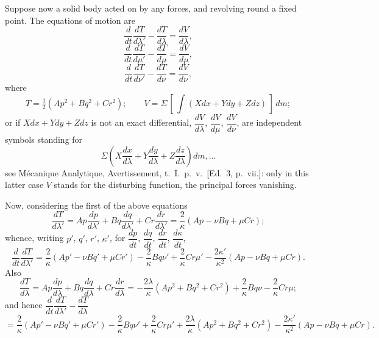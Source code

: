 \documentclass[11pt]{article}
\begin{document}
Suppose now a solid body acted on by any forces, and revolving round a fixed point. The equations of motion are
\[
\frac{d}{dt}\frac{dT}{d\lambda'} - \frac{dT}{d\lambda} = \frac{dV}{d\lambda},
\]
\[
\frac{d}{dt}\frac{dT}{d\mu'} - \frac{dT}{d\mu} = \frac{dV}{d\mu},
\]
\[
\frac{d}{dt}\frac{dT}{d\nu'} - \frac{dT}{d\nu} = \frac{dV}{d\nu},
\]
where
\[
T = \tfrac12 (A p^2 + B q^2 + C r^2); \qquad V = \Sigma\,[\,\int (X dx + Y dy + Z dz)\,]\,dm;
\]
or if $X dx + Y dy + Z dz$ is not an exact differential, $\dfrac{dV}{d\lambda}$, $\dfrac{dV}{d\mu}$, $\dfrac{dV}{d\nu}$, are independent symbols standing for
\[
\Sigma \left( X \frac{dx}{d\lambda} + Y \frac{dy}{d\lambda} + Z \frac{dz}{d\lambda} \right) dm, \ldots
\]
see M\'ecanique Analytique, Avertissement, t.~I.\ p.~v.\ [Ed.~3, p.~vii.]: only in this latter case $V$ stands for the disturbing function, the principal forces vanishing.

Now, considering the first of the above equations
\[
\frac{dT}{d\lambda'} = A p \frac{dp}{d\lambda'} + B q \frac{dq}{d\lambda'} + C r \frac{dr}{d\lambda'} = \frac{2}{\kappa}(A p - \nu B q + \mu C r);
\]
whence, writing $p'$, $q'$, $r'$, $\kappa'$, for $\dfrac{dp}{dt}$, $\dfrac{dq}{dt}$, $\dfrac{dr}{dt}$, $\dfrac{d\kappa}{dt}$,
\[
\frac{d}{dt}\frac{dT}{d\lambda'} = \frac{2}{\kappa}(A p' - \nu B q' + \mu C r') - \frac{2}{\kappa} B q \nu' + \frac{2}{\kappa} C r \mu' - \frac{2\kappa'}{\kappa^2}(A p - \nu B q + \mu C r).
\]
Also
\[
\frac{dT}{d\lambda} = A p \frac{dp}{d\lambda} + B q \frac{dq}{d\lambda} + C r \frac{dr}{d\lambda} = -\frac{2\lambda}{\kappa}(A p^2 + B q^2 + C r^2) + \frac{2}{\kappa} B q \nu - \frac{2}{\kappa} C r \mu;
\]
and hence $\dfrac{d}{dt}\dfrac{dT}{d\lambda'} - \dfrac{dT}{d\lambda}$
\[
= \frac{2}{\kappa}(A p' - \nu B q' + \mu C r') - \frac{2}{\kappa} B q \nu' + \frac{2}{\kappa} C r \mu' + \frac{2\lambda}{\kappa}(A p^2 + B q^2 + C r^2) - \frac{2\kappa'}{\kappa^2}(A p - \nu B q + \mu C r).
\]
\end{document}

